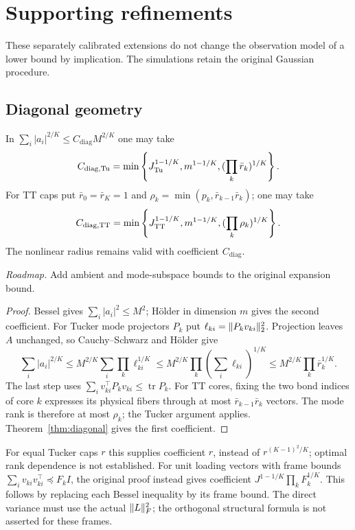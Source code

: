 
\section{Supporting refinements}\label{app:refinements}

These separately calibrated extensions do not change the observation model of a lower bound by implication. The simulations retain the original Gaussian procedure.

\subsection{Diagonal geometry}
\begin{proposition}\label{prop:budget}
In $\sum_i|a_i|^{2/K}\le C_{\mathrm{diag}} M^{2/K}$ one may take
\[
 C_{\mathrm{diag},\mathrm{Tu}}=\min\left\{J_{\mathrm{Tu}}^{1-1/K},m^{1-1/K},
                  (\prod_k\bar r_k)^{1/K}\right\}.
\]
For TT caps put $\bar r_0=\bar r_K=1$ and
$\rho_k=\min(p_k,\bar r_{k-1}\bar r_k)$; one may take
\[
 C_{\mathrm{diag},\mathrm{TT}}=\min\left\{J_{\mathrm{TT}}^{1-1/K},m^{1-1/K},
                  (\prod_k\rho_k)^{1/K}\right\}.
\]
The nonlinear radius remains valid with coefficient $C_{\mathrm{diag}}$.
\end{proposition}
\noindent\emph{Roadmap.} Add ambient and mode-subspace bounds to the original expansion bound.
\begin{proof}
Bessel gives $\sum_i|a_i|^2\le M^2$; H\"older in dimension $m$ gives the second coefficient. For Tucker mode projectors $P_k$ put $\ell_{ki}=\lVert P_kv_{ki}\rVert_2^2$. Projection leaves $A$ unchanged, so Cauchy--Schwarz and H\"older give
\[
 \sum_i|a_i|^{2/K}
 \le M^{2/K}\sum_i\prod_k\ell_{ki}^{1/K}
 \le M^{2/K}\prod_k(\sum_i\ell_{ki})^{1/K}
 \le M^{2/K}\prod_k\bar r_k^{1/K}.
\]
The last step uses $\sum_i v_{ki}^\top P_kv_{ki}\le\operatorname{tr}P_k$.
For TT cores, fixing the two bond indices of core $k$ expresses its physical fibers through at most $\bar r_{k-1}\bar r_k$ vectors. The mode rank is therefore at most $\rho_k$; the Tucker argument applies. Theorem~\ref{thm:diagonal} gives the first coefficient.
\end{proof}
For equal Tucker caps $r$ this supplies coefficient $r$, instead of $r^{(K-1)^2/K}$; optimal rank dependence is not established.
For unit loading vectors with frame bounds $\sum_i v_{ki}v_{ki}^\top\preceq F_kI$, the original proof instead gives coefficient $J^{1-1/K}\prod_kF_k^{1/K}$. This follows by replacing each Bessel inequality by its frame bound. The direct variance must use the actual $\lVert L\rVert_F^2$; the orthogonal structural formula is not asserted for these frames.

